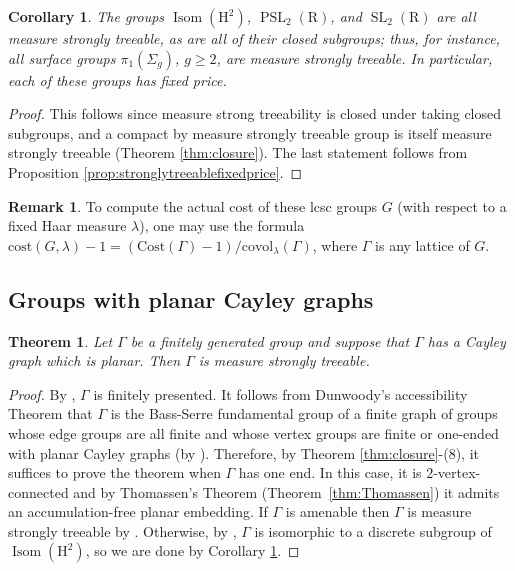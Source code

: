 \documentclass[11pt]{amsart}
\theoremstyle{definition}
\newtheorem{remark}[definition]{Remark}
\theoremstyle{plain}
\newtheorem{theorem}[definition]{Theorem}
\newtheorem{corollary}[definition]{Corollary}
\newcommand{\<}{\langle}
\renewcommand{\>}{\rangle}
\DeclareMathOperator{\Isom}{Isom}
\DeclareMathOperator{\SL}{SL}
\DeclareMathOperator{\PSL}{PSL}
\newcommand{\R}{\bm{\mathrm{R}}}
\newcommand{\HH}{\bm{\mathrm{H}}}
\begin{document}
\begin{corollary}\label{cor:subgroup}
The groups $\Isom(\HH ^2)$, $\PSL_2(\R )$, and $\SL_2(\R )$ are all measure strongly treeable, as are all of their closed subgroups; thus, for instance, all surface groups $\pi _1 (\Sigma _g )$, $g\geq 2$, are measure strongly treeable. In particular, each of these groups has fixed price.
\end{corollary}

\begin{proof}
This follows since measure strong treeability is closed under taking closed subgroups, and a compact by measure strongly treeable group is itself measure strongly treeable (Theorem \ref{thm:closure}).
The last statement follows from Proposition \ref{prop:stronglytreeablefixedprice}.
\end{proof}

\begin{remark}\label{rem:lcsccost}
To compute the actual cost of these lcsc groups $G$ (with respect to a fixed Haar measure $\lambda$), one may use the formula $\mathrm{cost}(G,\lambda ) -1 = (\mathrm{Cost}(\Gamma )-1)/\mathrm{covol}_{\lambda}(\Gamma )$, where $\Gamma$ is any lattice of $G$.
\end{remark}








\subsection{Groups with planar Cayley graphs}
%
\begin{theorem}\label{thm:planargroup}
Let $\Gamma$ be a finitely generated group and suppose that $\Gamma$ has a Cayley graph which is planar. Then $\Gamma$ is measure strongly treeable.
\end{theorem}
%
\begin{proof}
By \cite[Theorem 5.1]{Dr06}, $\Gamma$ is finitely presented.
It follows from Dunwoody's accessibility Theorem \cite{Dunwoody-1985}
that $\Gamma$ is the Bass-Serre fundamental group of a finite graph of groups whose edge groups are all finite and whose vertex groups are finite or one-ended with planar Cayley graphs (by \cite{Babai-1977}).
Therefore, by Theorem \ref{thm:closure}-(8), it suffices to prove the theorem when $\Gamma$ has one end.
In this case, it is $2$-vertex-connected and by Thomassen's Theorem (Theorem~\ref{thm:Thomassen}) it admits an accumulation-free planar embedding.
If $\Gamma$ is amenable then $\Gamma$ is measure strongly treeable by \cite{CFW81}.
Otherwise, by \cite[Theorem 3.1]{Bab97}, $\Gamma$ is isomorphic to a discrete subgroup of $\Isom(\HH ^2)$, so we are done by Corollary \ref{cor:subgroup}.
 \end{proof}
\end{document}
